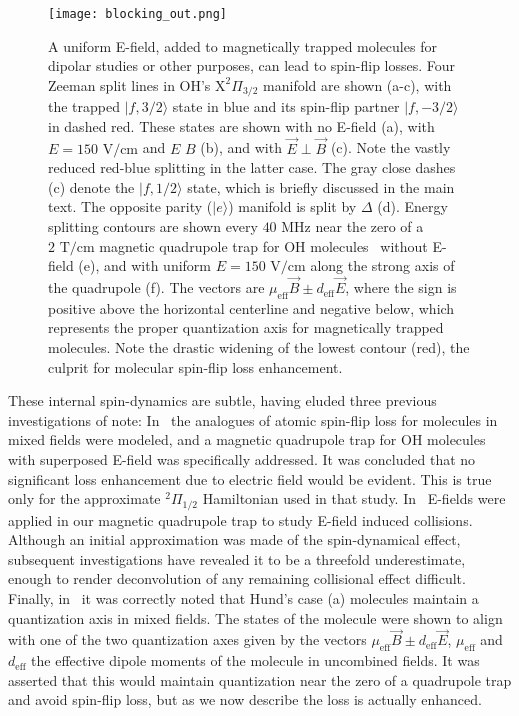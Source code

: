 \documentclass[%
 reprint,
 amsmath,amssymb,
 aps,
prl,
]{revtex4-1}
\newcommand{\epb}{{$\vec{E}\!\perp\!\vec{B}$}}
\begin{document}
\begin{figure}[tb]
\texttt{[image: blocking\_out.png]}%
\caption{
A uniform E-field, added to magnetically trapped molecules for dipolar studies or other purposes, can lead to spin-flip losses. 
Four Zeeman split lines in OH's $\mathrm{X}^2\Pi_{3/2}$ manifold are shown (a-c), with the trapped $|f,3/2\rangle$ state in blue and its spin-flip partner $|f,-3/2\rangle$ in dashed red. 
These states are shown with no E-field (a), with $E=150\text{ V/cm}$ and $E\,$\raisebox{0.5px}{$\parallel$}$\,B$ (b), and with \epb{} (c). 
Note the vastly reduced red-blue splitting in the latter case. 
The gray close dashes (c) denote the $|f,1/2\rangle$ state, which is briefly discussed in the main text.
The opposite parity ($|e\rangle$) manifold is split by $\Delta$ (d). 
Energy splitting contours are shown every $40\text{ MHz}$ near the zero of a $2\text{ T/cm}$ magnetic quadrupole trap for OH molecules~\cite{Stuhl2012uwave} without E-field (e), and with uniform $E=150\text{ V/cm}$ along the strong axis of the quadrupole (f). 
The vectors are $\mu_\text{eff}\vec{B}\pm d_\text{eff}\vec{E}$, where the sign is positive above the horizontal centerline and negative below, which  represents the proper quantization axis for magnetically trapped molecules. 
Note the drastic widening of the lowest contour (red), the culprit for molecular spin-flip loss enhancement.
}
\label{fig:blocking}
\end{figure}

These internal spin-dynamics are subtle, having eluded three previous investigations of note: In~\cite{Lara2008} the analogues of atomic spin-flip loss for molecules in mixed fields were modeled, and a magnetic quadrupole trap for OH molecules with superposed E-field was specifically addressed. 
It was concluded that no significant loss enhancement due to electric field would be evident. 
This is true only for the approximate $^2\Pi_{1/2}$ Hamiltonian used in that study. 
In~\cite{Stuhl2013} E-fields were applied in our magnetic quadrupole trap to study E-field induced collisions. 
Although an initial approximation was made of the spin-dynamical effect, subsequent investigations have revealed it to be a threefold underestimate, enough to render deconvolution of any remaining collisional effect difficult. 
Finally, in~\cite{Bohn2013} it was correctly noted that Hund's case (a) molecules maintain a quantization axis in mixed fields. 
The states of the molecule were shown to align with one of the two quantization axes given by the vectors $\mu_\text{eff}\vec{B}\pm d_\text{eff}\vec{E}$, $\mu_\text{eff}$ and $d_\text{eff}$ the effective dipole moments of the molecule in uncombined fields. 
It was asserted that this would maintain quantization near the zero of a quadrupole trap and avoid spin-flip loss, but as we now describe the loss is actually enhanced.
\end{document}
